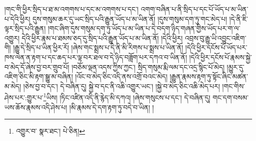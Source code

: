།གང་གི་ཕྱིར་སྲིད་པ་ཐ་མ་འགགས་པ་དང་མ་འགགས་པ་དང་། འགག་བཞིན་པ་ནི་སྲིད་པ་དང་པོ་ཡོད་པ་མ་ཡིན་པ་དེའི་ཕྱིར། དུས་གསུམ་ཆར་དུ་ཡང་སྲིད་པའི་རྒྱུན་ཡོད་པ་མ་ཡིན་ནོ། །དུས་གསུམ་དག་ཏུ་གང་མེད་པ། །དེ་ནི་ཇི་ལྟར་སྲིད་པའི་རྒྱུན། །གང་ཞིག་དུས་གསུམ་དག་ཏུ་ཡོད་པ་མ་ཡིན་པ་དེ་བདག་ཉིད་གཞན་གྱིས་ཡོད་པར་ག་ལ་འགྱུར། དེའི་ཕྱིར་རྣམ་པ་ཐམས་ཅད་དུ་སྲིད་པའི་རྒྱུན་ཡོད་པ་མ་ཡིན་ནོ། །དེའི་ཕྱིར། འབྲས་བུ་རྒྱུ་ཡི་འབྱུང་འཇིག་གི། །རྒྱུ་དེ་སྲིད་པ་ཡིན་ཕྱིར་རོ། །ཞེས་གང་སྨྲས་པ་དེ་ནི་མི་རིགས་པ་སྨྲས་པ་ཡིན་ནོ། །དེའི་ཕྱིར་དངོས་པོ་ཡོད་པར་ཁས་ལེན་ན་རྟག་པ་དང་ཆད་པར་ལྟ་བར་ཐལ་བ་དེ་ཉིད་བཟློག་པར་དཀའ་བ་ཡིན་ནོ། །དེའི་ཕྱིར་དངོས་པོ་རྣམས་སྐྱེ་བ་མེད་དོ་ཞེས་བྱ་བར་གྲུབ་པོ། །བཅོམ་ལྡན་འདས་ཀྱིས་ཀྱང་། སྲིད་གསུམ་རྨི་ལམ་དང་འདྲ་སྙིང་པོ་མེད། །མྱུར་དུ་འཇིག་ཅིང་མི་རྟག་སྒྱུ་མ་བཞིན། །འོང་བ་མེད་ཅིང་འདི་ནས་འགྲོ་བའང་མེད། །རྒྱུན་རྣམས་རྟག་ཏུ་སྟོང་ཞིང་མཚན་མ་མེད། །ཅེས་བྱ་བ་དང་། དེ་བཞིན་དུ། སྐྱེ་བ་དང་ནི་འཆི་འགྱུར་ཡང་། །སྐྱེ་བ་མེད་ཅིང་འཆི་མེད་པར། །གང་གིས་ཤེས་པར་:གྱུར་པ་\footnote{འགྱུར་བ་  སྣར་ཐང་།  པེ་ཅིན། }ཡིས། །ཏིང་འཛིན་འདི་ནི་རྙེད་མི་དཀའ། །ཞེས་གསུངས་པ་དང་། དེ་བཞིན་དུ། གང་དག་བསམ་ཡས་ཆོས་རྣམས་འདི་ཤེས་པ། །མི་རྣམས་དེ་དག་རྟག་ཏུ་བདེ་བ་ཡིན། །
